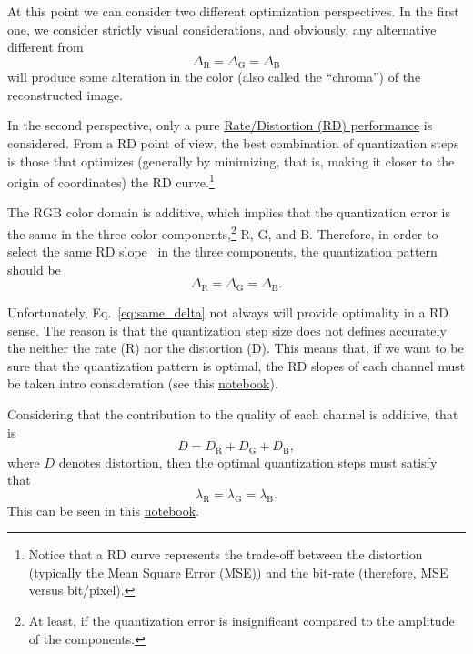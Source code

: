 At this point we can consider two different optimization
perspectives. In the first one, we consider strictly visual
considerations, and obviously, any alternative different from
\begin{equation}
  \Delta_{\text{R}} = \Delta_{\text{G}} = \Delta_{\text{B}}
  \label{eq:simple_Q}
\end{equation}
will produce some alteration in the color (also called the
``chroma'') of the reconstructed image.

In the second perspective, only a pure
\href{https://en.wikipedia.org/wiki/Rate-distortion_theory}{Rate/Distortion
  (RD) performance} is considered. From a RD point of view, the best
combination of quantization steps is those that optimizes (generally
by minimizing, that is, making it closer to the origin of coordinates)
the RD curve.\footnote{Notice that a RD curve represents the trade-off
between the distortion (typically the
\href{https://en.wikipedia.org/wiki/Root-mean-square_deviation}{Mean Square Error (MSE)}) and the bit-rate (therefore, MSE versus
bit/pixel).}

The $\text{RGB}$ color domain is additive, which implies that the
quantization error is the same in the three color
components,\footnote{At least, if the quantization error is
insignificant compared to the amplitude of the components.}
$\text{R}$, $\text{G}$, and $\text{B}$. Therefore, in order to select
the same RD slope~\cite{vruiz__information_theory} in the three
components, the quantization pattern should be
\begin{equation}
  \Delta_\text{R} = \Delta_\text{G} = \Delta_\text{B}.
  \label{eq:same_delta}
\end{equation}

Unfortunately, Eq.~\eqref{eq:same_delta} not always will provide
optimality in a RD sense. The reason is that the quantization step
size does not defines accurately the neither the rate (R) nor the
distortion (D). This means that, if we want to be sure that the
quantization pattern is optimal, the RD slopes of each channel must be
taken intro consideration (see this
\href{https://github.com/Sistemas-Multimedia/Sistemas-Multimedia.github.io/blob/master/contents/RGB_quantization/RD_performance.ipynb}{notebook}).

Considering that the contribution to the quality of each channel is
additive, that is
\begin{equation}
  D = D_{\text{R}} + D_{\text{G}} + D_{\text{B}},
  \label{eq:additive}
\end{equation}
where $D$ denotes distortion, then the optimal quantization steps must
satisfy
that~\cite{vruiz__information_theory,vetterli1995wavelets,sayood2017introduction}
\begin{equation}
  \lambda_{\text{R}} = \lambda_{\text{G}} = \lambda_{\text{B}}.
  \label{eq:optimal_quantization}
\end{equation}
 This can be seen in this
 \href{https://github.com/Sistemas-Multimedia/Sistemas-Multimedia.github.io/blob/master/milestones/RGB_SQ/RD_performance.ipynb}{notebook}.

